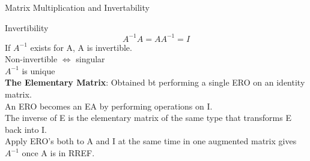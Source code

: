 \documentclass[a4paper, 12pt]{article}
\begin{document}
\begin{section}{Matrix Multiplication and Invertability}
\begin{subsection}{Invertibility}
\begin{equation}
	A^{-1}A=AA^{-1}=I
\end{equation}
If $A^{-1}$ exists for A, A is invertible.\\
Non-invertible $\Leftrightarrow$ singular\\
$A^{-1}$ is unique\\
\textbf{The Elementary Matrix}: Obtained bt performing a single ERO on an
identity matrix.\\
An ERO becomes an EA by performing operations on I.\\
The inverse of E is the elementary matrix of the same type that transforms
E back into I.\\ 
Apply ERO's both to A and I at the same time in one augmented matrix gives
$A^{-1}$ once A is in RREF.
\end{subsection}

\end{section}
\end{document}
